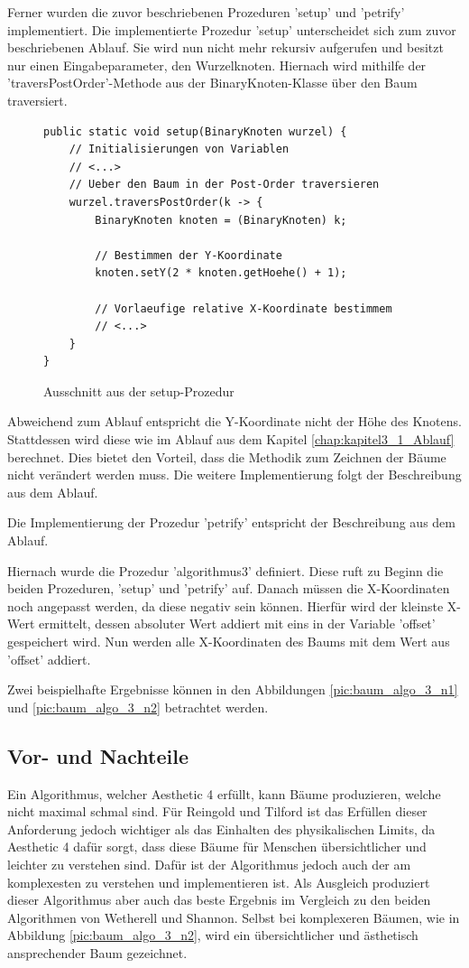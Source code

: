 Ferner wurden die zuvor beschriebenen Prozeduren 'setup' und 'petrify' implementiert. Die implementierte Prozedur
'setup' unterscheidet sich zum zuvor beschriebenen Ablauf. Sie wird nun nicht mehr rekursiv aufgerufen und besitzt 
nur einen Eingabeparameter, den Wurzelknoten. Hiernach wird mithilfe der 'traversPostOrder'-Methode aus der 
BinaryKnoten-Klasse über den Baum traversiert.

\begin{figure}[H]
\begin{lstlisting}
public static void setup(BinaryKnoten wurzel) {
    // Initialisierungen von Variablen
    // <...>
    // Ueber den Baum in der Post-Order traversieren
    wurzel.traversPostOrder(k -> {
        BinaryKnoten knoten = (BinaryKnoten) k;

        // Bestimmen der Y-Koordinate
        knoten.setY(2 * knoten.getHoehe() + 1);

        // Vorlaeufige relative X-Koordinate bestimmem
        // <...>
    }
}
\end{lstlisting}
    \caption{Ausschnitt aus der setup-Prozedur}
    \label{code:algo3_setup}
\end{figure}

Abweichend zum Ablauf entspricht die Y-Koordinate nicht der Höhe des Knotens. Stattdessen wird diese wie im 
Ablauf aus dem Kapitel \ref{chap:kapitel3_1_Ablauf} berechnet. Dies bietet den Vorteil, 
dass die Methodik zum Zeichnen der Bäume nicht verändert werden muss. Die weitere Implementierung folgt 
der Beschreibung aus dem Ablauf.

Die Implementierung der Prozedur 'petrify' entspricht der Beschreibung aus dem Ablauf.

Hiernach wurde die Prozedur 'algorithmus3' definiert. Diese ruft zu Beginn die beiden Prozeduren, 
'setup' und 'petrify' auf. Danach müssen die X-Koordinaten noch angepasst werden, da diese 
negativ sein können. Hierfür wird der kleinste X-Wert ermittelt, dessen absoluter Wert 
addiert mit eins in der Variable 'offset' gespeichert wird. Nun werden alle X-Koordinaten des 
Baums mit dem Wert aus 'offset' addiert. 

Zwei beispielhafte Ergebnisse können in den Abbildungen \ref{pic:baum_algo_3_n1} 
und \ref{pic:baum_algo_3_n2} betrachtet werden. 


\subsection{Vor- und Nachteile}
Ein Algorithmus, welcher Aesthetic 4 erfüllt, kann Bäume produzieren, welche nicht maximal schmal sind. 
Für Reingold und Tilford ist das Erfüllen dieser Anforderung jedoch wichtiger als das Einhalten des physikalischen Limits, 
da Aesthetic 4 dafür sorgt, dass diese Bäume für Menschen übersichtlicher und leichter zu verstehen sind. Dafür ist der Algorithmus 
jedoch auch der am komplexesten zu verstehen und implementieren ist. Als Ausgleich produziert dieser Algorithmus aber auch das beste Ergebnis
im Vergleich zu den beiden Algorithmen von Wetherell und Shannon. Selbst bei komplexeren Bäumen, wie in Abbildung \ref{pic:baum_algo_3_n2},
wird ein übersichtlicher und ästhetisch ansprechender Baum gezeichnet. 

